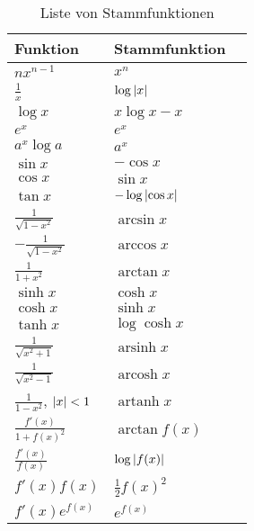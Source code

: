 \documentclass[a4paper]{article}
\theoremstyle{marginbreak}
\DeclareMathOperator{\arsinh}{arsinh}
\DeclareMathOperator{\arcosh}{arcosh}
\DeclareMathOperator{\artanh}{artanh}
\begin{document}
	\begin{multicols}{2}
		\begin{table}[H]
			\centering
			\begin{tabular}{ | M{2.5cm} | M{2.5cm} | N}
				\hline
				Funktion & Stammfunktion & \\[0.6cm] \hline \hline
				$nx^{n-1}$ & $x^n$ & \\[0.6cm] \hline
				$\frac{1}{x}$ & $\log\abs{x}$ & \\[0.6cm] \hline
				$\log x$ & $x\log x - x$ & \\[0.6cm] \hline
				$e^x$ & $e^x$ & \\[0.6cm] \hline
				$a^x\log a$ & $a^x$ & \\[0.6cm] \hline \hline
				$\sin x$ & $-\cos x$ & \\[0.6cm] \hline
				$\cos x$ & $\sin x$ & \\[0.6cm] \hline
				$\tan x$ & $-\log\abs{\cos x}$ & \\[0.6cm] \hline \hline
				$\frac{1}{\sqrt{1-x^2}}$ & $\arcsin x$ & \\[0.6cm] \hline
				$-\frac{1}{\sqrt{1-x^2}}$ & $\arccos x$ & \\[0.6cm] \hline
				$\frac{1}{1+x^2}$ & $\arctan x$ & \\[0.6cm] \hline \hline
				$\sinh x$ & $\cosh x$ & \\[0.6cm] \hline
				$\cosh x$ & $\sinh x$ & \\[0.6cm] \hline
				$\tanh x$ & $\log\cosh x$ & \\[0.6cm] \hline \hline
				$\frac{1}{\sqrt{x^2+1}}$ & $\arsinh x$ & \\[0.6cm] \hline
				$\frac{1}{\sqrt{x^2-1}}$ & $\arcosh x$ & \\[0.6cm] \hline
				$\frac{1}{1-x^2}$, $\abs{x}<1$ & $\artanh x$ & \\[0.6cm] \hline \hline
				$\frac{f'(x)}{1+f(x)^2}$ & $\arctan f(x)$ & \\[0.6cm] \hline
				$\frac{f'(x)}{f(x)}$ & $\log\abs{f(x)}$ & \\[0.6cm] \hline
				$f'(x)f(x)$ & $\frac{1}{2}f(x)^2$ & \\[0.6cm] \hline
				$f'(x)e^{f(x)}$ & $e^{f(x)}$ & \\[0.6cm] \hline
			\end{tabular}
			\caption{Liste von Stammfunktionen}
		\end{table}
		\begin{table}[H]
			\centering
			\begin{tabular}{ | M{3.5cm} | M{3.5cm} | N}

\end{tabular}
\end{table}
\end{multicols}
\end{document}

